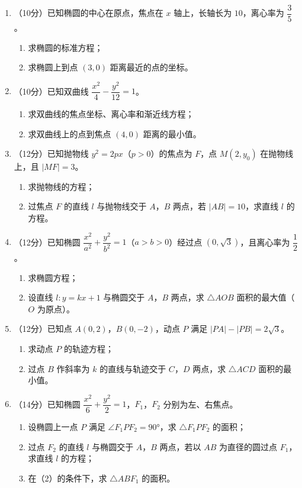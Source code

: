 \documentclass[12pt, a4paper]{ctexart}
\begin{document}
\begin{enumerate}[resume]
\item （10分）已知椭圆的中心在原点，焦点在 $x$ 轴上，长轴长为 $10$，离心率为 $\dfrac{3}{5}$。
\begin{enumerate}[label=(\arabic*)]
\item 求椭圆的标准方程；
\item 求椭圆上到点 $(3,0)$ 距离最近的点的坐标。
\end{enumerate}

\item （10分）已知双曲线 $\dfrac{x^2}{4}-\dfrac{y^2}{12}=1$。
\begin{enumerate}[label=(\arabic*)]
\item 求双曲线的焦点坐标、离心率和渐近线方程；
\item 求双曲线上的点到焦点 $(4,0)$ 距离的最小值。
\end{enumerate}

\item （12分）已知抛物线 $y^2=2px$（$p>0$）的焦点为 $F$，点 $M(2,y_0)$ 在抛物线上，且 $|MF|=3$。
\begin{enumerate}[label=(\arabic*)]
\item 求抛物线的方程；
\item 过焦点 $F$ 的直线 $l$ 与抛物线交于 $A$，$B$ 两点，若 $|AB|=10$，求直线 $l$ 的方程。
\end{enumerate}

\item （12分）已知椭圆 $\dfrac{x^2}{a^2}+\dfrac{y^2}{b^2}=1$（$a>b>0$）经过点 $(0,\sqrt{3})$，且离心率为 $\dfrac{1}{2}$。
\begin{enumerate}[label=(\arabic*)]
\item 求椭圆方程；
\item 设直线 $l: y=kx+1$ 与椭圆交于 $A$，$B$ 两点，求 $\triangle AOB$ 面积的最大值（$O$ 为原点）。
\end{enumerate}

\item （12分）已知点 $A(0,2)$，$B(0,-2)$，动点 $P$ 满足 $|PA|-|PB|=2\sqrt{3}$。
\begin{enumerate}[label=(\arabic*)]
\item 求动点 $P$ 的轨迹方程；
\item 过点 $B$ 作斜率为 $k$ 的直线与轨迹交于 $C$，$D$ 两点，求 $\triangle ACD$ 面积的最小值。
\end{enumerate}

\item （14分）已知椭圆 $\dfrac{x^2}{6}+\dfrac{y^2}{2}=1$，$F_1$，$F_2$ 分别为左、右焦点。
\begin{enumerate}[label=(\arabic*)]
\item 设椭圆上一点 $P$ 满足 $\angle F_1PF_2=90°$，求 $\triangle F_1PF_2$ 的面积；
\item 过点 $F_2$ 的直线 $l$ 与椭圆交于 $A$，$B$ 两点，若以 $AB$ 为直径的圆过点 $F_1$，求直线 $l$ 的方程；
\item 在（2）的条件下，求 $\triangle ABF_1$ 的面积。
\end{enumerate}
\end{enumerate}
\end{document}
